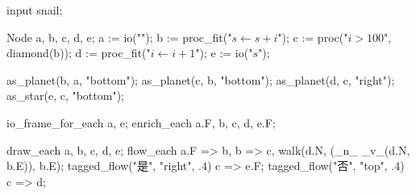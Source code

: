 \usemodule[zhfonts]
\startMPpage
input snail;

Node a, b, c, d, e;
a := io("");
b := proc_fit("$s\leftarrow s + i$");
c := proc("$i > 100$", diamond(b));
d := proc_fit("$i\leftarrow i + 1$");
e := io("$s$");

as_planet(b, a, "bottom");
as_planet(c, b, "bottom");
as_planet(d, c, "right");
as_star(e, c, "bottom");

io_frame_for_each a, e;
enrich_each a.F, b, c, d, e.F;

draw_each a, b, c, d, e;
flow_each a.F => b, b => c, walk(d.N, (_n_ _v_(d.N, b.E)), b.E);
tagged_flow("是", "right", .4) c => e.F;
tagged_flow("否", "top", .4) c => d;
\stopMPpage